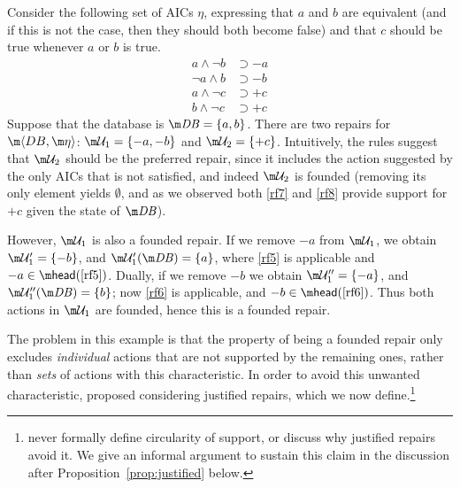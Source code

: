 \begin{example}
  \label{ex:founded}
  Consider the following set of AICs $\eta$, expressing that $a$ and $b$ are equivalent (and if this is not the case, then they should both become false) and that $c$ should be true whenever $a$ or $b$ is true.
  \begin{align}
    a\land\neg b &\supset{-a} \label{rf5} \\
    \neg a\land b &\supset{-b} \label{rf6} \\
    a\land\neg c &\supset{+c} \label{rf7} \\
    b\land\neg c &\supset{+c} \label{rf8} 
  \end{align}
  Suppose that the database is $\db=\{a,b\}$.
  There are two repairs for $\fulldb$: $\UU_1=\{{-a},{-b}\}$ and $\UU_2=\{{+c}\}$.
  Intuitively, the rules suggest that $\UU_2$ should be the preferred repair, since it includes the action suggested by the only AICs that is not satisfied, and indeed $\UU_2$ is founded (removing its only element yields $\emptyset$, and as we observed both \ref{rf7} and \ref{rf8} provide support for ${+c}$ given the state of $\db$).

  However, $\UU_1$ is also a founded repair.
  If we remove ${-a}$ from $\UU_1$, we obtain $\UU_1'=\{{-b}\}$, and $\UU_1'(\db)=\{a\}$, where \ref{rf5} is applicable and ${-a}\in\head(\ref{rf5})$.
  Dually, if we remove ${-b}$ we obtain $\UU_1''=\{{-a}\}$, and $\UU_1''(\db)=\{b\}$; now \ref{rf6} is applicable, and ${-b}\in\head(\ref{rf6})$.
  Thus both actions in $\UU_1$ are founded, hence this is a founded repair.
\end{example}

The problem in this example is that the property of being a founded repair only excludes \emph{individual} actions that are not supported by the remaining ones, rather than \emph{sets} of actions with this characteristic.
In order to avoid this unwanted characteristic, \citet{tplp/CaropreseT11} proposed considering justified repairs, which we now define.\footnote{\citet{tplp/CaropreseT11} never formally define circularity of support, or discuss why justified repairs avoid it. We give an informal argument to sustain this claim in the discussion after Proposition~\ref{prop:justified} below.}

